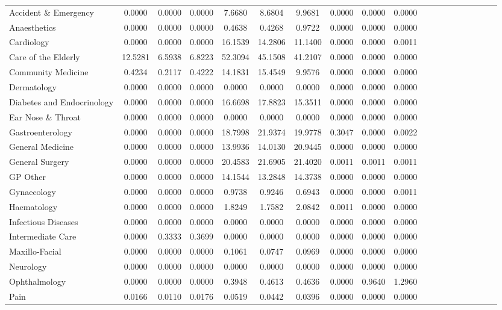 \documentclass[thesis.tex]{subfiles}
\begin{document}
\begin{landscape}
\begin{table}[h!]
{\begin{tabular}{lcccccccccccccccccc}
Accident \& Emergency&	0.0000&	0.0000&	0.0000&	7.6680&	8.6804&	9.9681&	0.0000&	0.0000&	0.0000\\
Anaesthetics&	0.0000&	0.0000&	0.0000&	0.4638&	0.4268&	0.9722&	0.0000&	0.0000&	0.0000\\
Cardiology&	0.0000&	0.0000&	0.0000&	16.1539&	14.2806&	11.1400&	0.0000&	0.0000&	0.0011\\
Care of the Elderly&	12.5281&	6.5938&	6.8223&	52.3094&	45.1508&	41.2107&	0.0000&	0.0000&	0.0000\\
Community Medicine	&0.4234&	0.2117&	0.4222&	14.1831&	15.4549&	9.9576&	0.0000&	0.0000&	0.0000\\
Dermatology&	0.0000&	0.0000&	0.0000&	0.0000&	0.0000&	0.0000&	0.0000&	0.0000&	0.0000\\
Diabetes and Endocrinology&	0.0000&	0.0000&	0.0000&	16.6698&	17.8823&	15.3511&	0.0000&	0.0000&	0.0000\\
Ear Nose \& Throat&	0.0000&	0.0000&	0.0000&	0.0000&	0.0000&	0.0000&	0.0000&	0.0000&	0.0000\\
Gastroenterology&	0.0000&	0.0000&	0.0000&	18.7998&	21.9374&	19.9778&	0.3047&	0.0000&	0.0022\\
General Medicine	&0.0000&	0.0000&	0.0000&	13.9936&	14.0130&	20.9445&	0.0000&	0.0000&	0.0000\\
General Surgery	&0.0000&	0.0000&	0.0000&	20.4583&	21.6905&	21.4020&	0.0011&	0.0011&	0.0011\\
GP Other	&0.0000&	0.0000&	0.0000&	14.1544&	13.2848&	14.3738&	0.0000&	0.0000&	0.0000\\
Gynaecology&	0.0000&	0.0000&	0.0000&	0.9738&	0.9246&	0.6943&	0.0000&	0.0000&	0.0011\\
Haematology&	0.0000&	0.0000&	0.0000&	1.8249&	1.7582&	2.0842&	0.0011&	0.0000&	0.0000\\
Infectious Diseases	&0.0000&	0.0000&	0.0000&	0.0000&	0.0000&	0.0000&	0.0000&	0.0000&	0.0000\\
Intermediate Care	&0.0000&	0.3333&	0.3699&	0.0000&	0.0000&	0.0000&	0.0000&	0.0000&	0.0000\\
Maxillo-Facial&	0.0000&	0.0000&	0.0000&	0.1061&	0.0747&	0.0969&	0.0000&	0.0000&	0.0000\\
Neurology&	0.0000&	0.0000&	0.0000&	0.0000&	0.0000&	0.0000&	0.0000&	0.0000&	0.0000\\
Ophthalmology&	0.0000&	0.0000&	0.0000&	0.3948&	0.4613&	0.4636&	0.0000&	0.9640&	1.2960\\
Pain&	0.0166&	0.0110&	0.0176&	0.0519&	0.0442&	0.0396&	0.0000&	0.0000&	0.0000\\

\end{tabular}}
\end{table}
\end{landscape}
\end{document}
